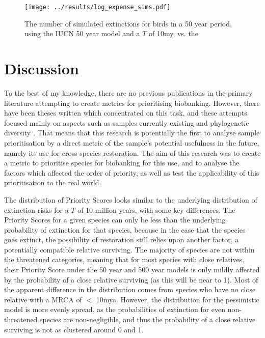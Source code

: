 \documentclass[10pt]{article}
\begin{document}
	
	\begin{figure}
		\texttt{[image: ../results/log\_expense\_sims.pdf]}
		\caption{The number of simulated extinctions for birds in a 50 year period,
		using the IUCN 50 year model and a $T$ of 10my, vs. the }\label{expense_sims}
	\end{figure}
	
	\section{Discussion}
	To the best of my knowledge, there are no previous publications in the
	primary literature attempting to create metrics for prioritising
	biobanking. However, there have been theses written which concentrated
	on this task, and these attempts focused mainly on aspects such as
	samples currently existing and phylogenetic diversity 
	\citep{mooneyValueExSitu2021,harwoodDevelopingImplementingPrioritisation2021}.
	That means that this research is potentially
	the first to analyse sample prioritisation by
	a direct metric of the sample's potential usefulness in the future,
	namely its use for cross-species restoration. The aim of this research
	was to create a metric to prioritise species for biobanking for this
	use, and to analyse the factors which affected the order of priority,
	as well as test the applicability of this prioritisation to the
	real world.
	
	The distribution of Priority Scores looks similar to the underlying
	distribution of extinction risks for a $T$ of 10 million years, with some
	key differences. The Priority Scores for a given species can only be less
	than the underlying probability of extinction for that species, because
	in the case that the species goes extinct, the possibility of restoration
	still relies upon another factor, a potentially compatible relative
	surviving. The
	majority of species are not within the threatened categories, meaning
	that for most species with close relatives, their Priority Score under
	the 50 year and 500 year models is only
	mildly affected by the probability of a close relative surviving (as this
	will be near to 1). Most of the apparent difference in the distribution
	comes from species who have no close relative with a MRCA of $<$ 10mya.
	However, the distribution for the pessimistic model is more evenly spread,
	as the probabilities of extinction for even non-threatened species are
	non-negligible, and thus the probability of a close relative surviving
	is not as clustered around 0 and 1.
	
\end{document}
